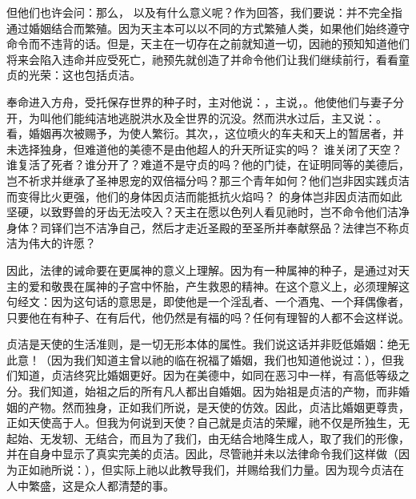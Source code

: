 但他们也许会问：那么， 以及有什么意义呢？作为回答，我们要说：并不完全指通过婚姻结合而繁殖。因为天主本可以以不同的方式繁殖人类，如果他们始终遵守命令而不违背的话。但是，天主在一切存在之前就知道一切，因祂的预知知道他们将来会陷入违命并应受死亡，祂预先就创造了并命令他们让我们继续前行，看看童贞的光荣：这也包括贞洁。\par

奉命进入方舟，受托保存世界的种子时，主对他说：，主说，。他使他们与妻子分开，为叫他们能纯洁地逃脱洪水及全世界的沉没。然而洪水过后，主又说：。 看，婚姻再次被赐予，为使人繁衍。其次，，这位喷火的车夫和天上的暂居者，并未选择独身，但难道他的美德不是由他超人的升天所证实的吗？ 谁关闭了天空？谁复活了死者？谁分开了？难道不是守贞的吗？他的门徒，在证明同等的美德后，岂不祈求并继承了圣神恩宠的双倍福分吗？那三个青年如何？他们岂非因实践贞洁而变得比火更强，他们的身体因贞洁而能抵抗火焰吗？ 的身体岂非因贞洁而如此坚硬，以致野兽的牙齿无法咬入？天主在愿以色列人看见祂时，岂不命令他们洁净身体？司铎们岂不洁净自己，然后才走近圣殿的至圣所并奉献祭品？法律岂不称贞洁为伟大的许愿？\par

因此，法律的诫命要在更属神的意义上理解。因为有一种属神的种子，是通过对天主的爱和敬畏在属神的子宫中怀胎，产生救恩的精神。在这个意义上，必须理解这句经文：因为这句话的意思是，即使他是一个淫乱者、一个酒鬼、一个拜偶像者，只要他在有种子、在有后代，他仍然是有福的吗？任何有理智的人都不会这样说。\par

贞洁是天使的生活准则，是一切无形本体的属性。我们说这话并非贬低婚姻：绝无此意！（因为我们知道主曾以祂的临在祝福了婚姻，我们也知道他说过：），但我们知道，贞洁终究比婚姻更好。因为在美德中，如同在恶习中一样，有高低等级之分。我们知道，始祖之后的所有凡人都出自婚姻。因为始祖是贞洁的产物，而非婚姻的产物。然而独身，正如我们所说，是天使的仿效。因此，贞洁比婚姻更尊贵，正如天使高于人。但我为何说到天使？自己就是贞洁的荣耀，祂不仅是所独生，无起始、无发轫、无结合，而且为了我们，由无结合地降生成人，取了我们的形像，并在自身中显示了真实完美的贞洁。因此，尽管祂并未以法律命令我们这样做（因为正如祂所说：），但实际上祂以此教导我们，并赐给我们力量。因为现今贞洁在人中繁盛，这是众人都清楚的事。\par

